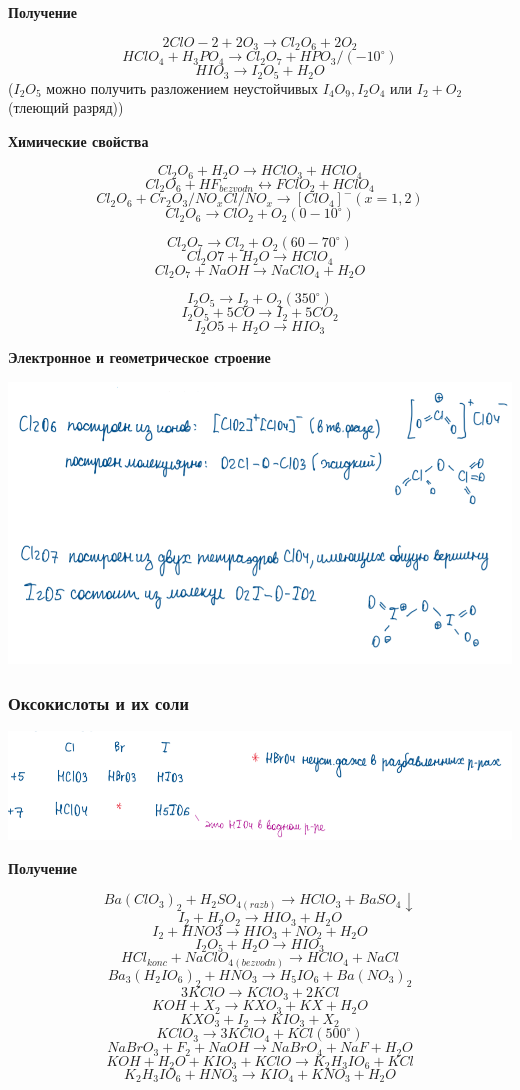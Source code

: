 \textbf{Получение}

$$2ClO-2 + 2O_3 \rightarrow Cl_2O_6 + 2O_2$$
$$HClO_4 + H_3PO_4 \rightarrow Cl_2O_7 + HPO_3/(-10^{\circ})$$
$$HIO_3 \rightarrow I_2O_5 + H_2O$$
($I_2O_5$ можно получить разложением неустойчивых $I_4O_9,I_2O_4$ или $I_2 + O_2$(тлеющий разряд))

\textbf{Химические свойства}

$$Cl_2O_6 + H_2O \rightarrow HClO_3 + HClO_4$$
$$Cl_2O_6 + HF_{bezvodn}\leftrightarrow FClO_2 + HClO_4$$
$$Cl_2O_6 + Cr_2O_3/NO_xCl/NO_x \rightarrow [ClO_4]^-(x=1,2)$$
$$ Cl_2O_6 \rightarrow ClO_2 + O_2(0-10^{\circ})$$

$$Cl_2O_7 \rightarrow Cl_2 + O_2(60-70^{\circ})$$
$$Cl_2O7 +H_2O \rightarrow HClO_4$$
$$Cl_2O_7 + NaOH \rightarrow NaClO_4 + H_2O$$

$$I_2O_5 \rightarrow I_2 + O_2 (350^{\circ})$$
$$I_2O_5 + 5CO \rightarrow I_2 + 5CO_2$$
$$I_2O5 + H_2O \rightarrow HIO_3$$

\textbf{Электронное и геометрическое строение}

\includegraphics[scale=0.9]{images/5v3.png}

\subsubsection*{Оксокислоты и их соли}

\includegraphics{images/5v4.png}

\textbf{Получение}

$$Ba(ClO_3)_2 + H_2SO_{4(razb)} \rightarrow HClO_3 + BaSO_4\downarrow$$
$$ I_2  + H_2O_2 \rightarrow HIO_3 + H_2O$$
$$I_2 + HNO3 \rightarrow HIO_3 + NO_2 + H_2O$$
$$I_2O_5 + H_2O \rightarrow HIO_3$$
$$HCl_{konc} + NaClO_{4(bezvodn)} \rightarrow HClO_4 + NaCl$$
$$Ba_3(H_2IO_6)_2 + HNO_3 \rightarrow H_5IO_6 + Ba(NO_3)_2$$
$$3KClO \rightarrow KClO_3 + 2KCl$$
$$KOH + X_2 \rightarrow KXO_3 + KX + H_2O$$
$$KXO_3 + I_2 \rightarrow KIO_3 + X_2$$
$$KClO_3\rightarrow 3KClO_4 + KCl (500^{\circ})$$
$$NaBrO_3 + F_2 + NaOH \rightarrow NaBrO_4 + NaF + H_2O$$
$$KOH + H_2O +KIO_3 + KClO \rightarrow K_2H_3IO_6 + KCl$$
$$K_2H_3IO_6 + HNO_3 \rightarrow KIO_4 + KNO_3 + H_2O$$

